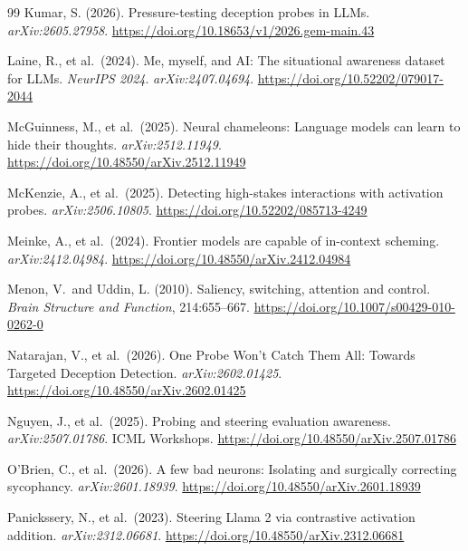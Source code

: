 \documentclass[11pt,letterpaper]{article}
\begin{document}
\begin{thebibliography}{99}
Kumar, S. (2026).
\newblock Pressure-testing deception probes in {LLMs}.
\newblock \textit{arXiv:2605.27958}.
\newblock \url{https://doi.org/10.18653/v1/2026.gem-main.43}

Laine, R., et al.\ (2024).
\newblock Me, myself, and {AI}: The situational awareness dataset for {LLMs}.
\newblock \textit{NeurIPS 2024}. \textit{arXiv:2407.04694}.
\newblock \url{https://doi.org/10.52202/079017-2044}

McGuinness, M., et al.\ (2025).
\newblock Neural chameleons: Language models can learn to hide their thoughts.
\newblock \textit{arXiv:2512.11949}.
\newblock \url{https://doi.org/10.48550/arXiv.2512.11949}

McKenzie, A., et al.\ (2025).
\newblock Detecting high-stakes interactions with activation probes.
\newblock \textit{arXiv:2506.10805}.
\newblock \url{https://doi.org/10.52202/085713-4249}

Meinke, A., et al.\ (2024).
\newblock Frontier models are capable of in-context scheming.
\newblock \textit{arXiv:2412.04984}.
\newblock \url{https://doi.org/10.48550/arXiv.2412.04984}

Menon, V.\ and Uddin, L. (2010).
\newblock Saliency, switching, attention and control.
\newblock \textit{Brain Structure and Function}, 214:655--667.
\newblock \url{https://doi.org/10.1007/s00429-010-0262-0}

Natarajan, V., et al.\ (2026).
\newblock One Probe Won't Catch Them All: Towards Targeted Deception Detection.
\newblock \textit{arXiv:2602.01425}.
\newblock \url{https://doi.org/10.48550/arXiv.2602.01425}

Nguyen, J., et al.\ (2025).
\newblock Probing and steering evaluation awareness.
\newblock \textit{arXiv:2507.01786}. ICML Workshops.
\newblock \url{https://doi.org/10.48550/arXiv.2507.01786}

O'Brien, C., et al.\ (2026).
\newblock A few bad neurons: Isolating and surgically correcting sycophancy.
\newblock \textit{arXiv:2601.18939}.
\newblock \url{https://doi.org/10.48550/arXiv.2601.18939}

Panickssery, N., et al.\ (2023).
\newblock Steering {Llama} 2 via contrastive activation addition.
\newblock \textit{arXiv:2312.06681}.
\newblock \url{https://doi.org/10.48550/arXiv.2312.06681}


\end{thebibliography}
\end{document}
